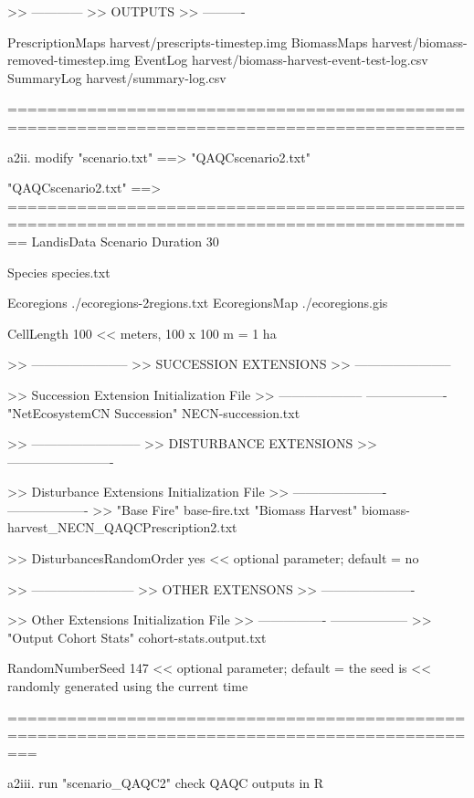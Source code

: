 	
>> ------------
>> OUTPUTS
>> ----------

PrescriptionMaps    harvest/prescripts-{timestep}.img
BiomassMaps         harvest/biomass-removed-{timestep}.img
EventLog            harvest/biomass-harvest-event-test-log.csv
SummaryLog	    harvest/summary-log.csv


============================================================================================



	a2ii. modify "scenario.txt"
		==> "QAQCscenario2.txt"

"QAQCscenario2.txt" ==>
==============================================================================================
LandisData  Scenario
Duration  30

Species   species.txt

Ecoregions      ./ecoregions-2regions.txt
EcoregionsMap   ./ecoregions.gis

CellLength  100 << meters, 100 x 100 m = 1 ha


>> -----------------------
>> SUCCESSION EXTENSIONS
>> -----------------------

>> 	Succession Extension     	Initialization File
>> 	--------------------     	-------------------
   	"NetEcosystemCN Succession"	NECN-succession.txt


>> --------------------------
>> DISTURBANCE EXTENSIONS
>> -------------------------

>> 	Disturbance Extensions   	Initialization File
>>	 ----------------------   	-------------------
>>	"Base Fire"			base-fire.txt
	"Biomass Harvest"		biomass-harvest_NECN_QAQCPrescription2.txt


>>   DisturbancesRandomOrder  yes  << optional parameter; default = no

>> ------------------------
>> OTHER EXTENSONS
>> ----------------------

>> 	Other Extensions         	Initialization File
>>	 ----------------         	------------------
>>  	 "Output Cohort Stats"    	cohort-stats.output.txt


RandomNumberSeed  147  << optional parameter; default = the seed is
                         << randomly generated using the current time

===============================================================================================




	a2iii. run "scenario_QAQC2" check QAQC outputs in R

